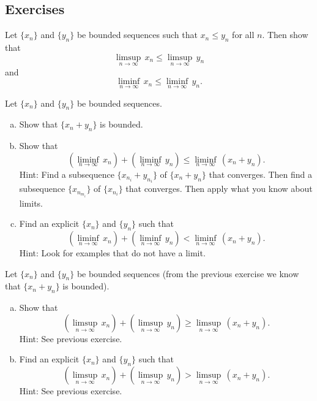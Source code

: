 \documentclass[12pt]{book}
\begin{document}
\subsection*{Exercises}


\begin{exercise}
Let $\{ x_n \}$ and $\{ y_n \}$ be bounded sequences such that
$x_n \leq y_n$ for all $n$.
Then show that
\begin{equation*}
\limsup_{n\to\infty} \, x_n \leq
\limsup_{n\to\infty} \, y_n
\end{equation*}
and
\begin{equation*}
\liminf_{n\to\infty} \, x_n \leq
\liminf_{n\to\infty} \, y_n .
\end{equation*}
\end{exercise}

\begin{exercise}
Let $\{ x_n \}$ and $\{ y_n \}$ be bounded sequences.
\begin{enumerate}[a)]
\item
Show that $\{ x_n + y_n \}$ is bounded.
\item
Show that
\begin{equation*}
(\liminf_{n\to \infty}\, x_n)
+
(\liminf_{n\to \infty}\, y_n)
\leq
\liminf_{n\to \infty}\, (x_n+y_n) .
\end{equation*}
Hint: Find a subsequence $\{ x_{n_i}+y_{n_i} \}$ of $\{ x_n + y_n \}$
that converges.
Then find a subsequence $\{ x_{n_{m_i}} \}$ of $\{ x_{n_i} \}$ that converges.
Then apply what you know about limits.
\item
Find an explicit $\{ x_n \}$ and $\{ y_n \}$ such that
\begin{equation*}
(\liminf_{n\to \infty}\, x_n)
+
(\liminf_{n\to \infty}\, y_n)
<
\liminf_{n\to \infty}\, (x_n+y_n) .
\end{equation*}
Hint: Look for examples that do not have a limit.
\end{enumerate}
\end{exercise}

\begin{samepage}
\begin{exercise}
Let $\{ x_n \}$ and $\{ y_n \}$ be bounded sequences (from the previous
exercise we know that $\{ x_n + y_n \}$ is bounded).
\begin{enumerate}[a)]
\item
Show that
\begin{equation*}
(\limsup_{n\to \infty}\, x_n)
+
(\limsup_{n\to \infty}\, y_n)
\geq
\limsup_{n\to \infty}\, (x_n+y_n) .
\end{equation*}
Hint: See previous exercise.
\item
Find an explicit $\{ x_n \}$ and $\{ y_n \}$ such that
\begin{equation*}
(\limsup_{n\to \infty}\, x_n)
+
(\limsup_{n\to \infty}\, y_n)
>
\limsup_{n\to \infty}\, (x_n+y_n) .
\end{equation*}
Hint: See previous exercise.
\end{enumerate}
\end{exercise}
\end{samepage}
\end{document}
